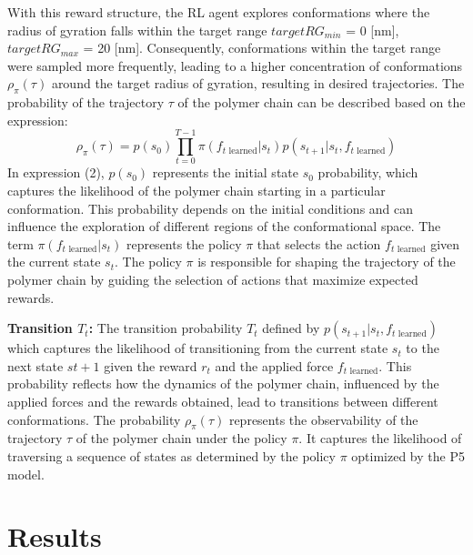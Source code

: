 \documentclass{article}
\theoremstyle{plain}
\theoremstyle{definition}
\theoremstyle{remark}
\begin{document}
With this reward structure, the RL agent explores conformations where the radius of gyration falls within the target range $targetRG_{min}$ = 0 [nm], $targetRG_{max}$ = 20 [nm]. Consequently, conformations within the target range were sampled more frequently, leading to a higher concentration of conformations $\rho_\pi(\tau)$ around the target radius of gyration, resulting in desired trajectories. The probability of the trajectory $\tau$ of the polymer chain can be described based on the expression:
\[
\rho_{\pi}(\tau) = p(s_0) \prod_{t=0}^{T-1} \pi(f_{t\text{ learned}}|s_t) p(s_{t+1}|s_t,f_{t\text{ learned}})  \tag{2}
\]
In expression (2), $p(s_0)$ represents the initial state $s_0$ probability, which captures the likelihood of the polymer chain starting in a particular conformation. This probability depends on the initial conditions and can influence the exploration of different regions of the conformational space. The term $\pi(f_{t\text{ learned}}|s_t)$ represents the policy $\pi$ that selects the action $f_{t\text{ learned}}$ given the current state $s_t$. The policy $\pi$ is responsible for shaping the trajectory of the polymer chain by guiding the selection of actions that maximize expected rewards.

\textbf{Transition $T_t$: } The transition probability $T_t$ defined by $p(s_{t+1}|s_t,f_{t\text{ learned}})$ which captures the likelihood of transitioning from the current state $s_t$ to the next state $s{t+1}$ given the reward $r_t$ and the applied force $f_{t\text{ learned}}$. This probability reflects how the dynamics of the polymer chain, influenced by the applied forces and the rewards obtained, lead to transitions between different conformations. The probability $\rho_{\pi}(\tau)$ represents the observability of the trajectory $\tau$ of the polymer chain under the policy $\pi$. It captures the likelihood of traversing a sequence of states as determined by the policy $\pi$ optimized by the P5 model.


\section{Results}
\end{document}
